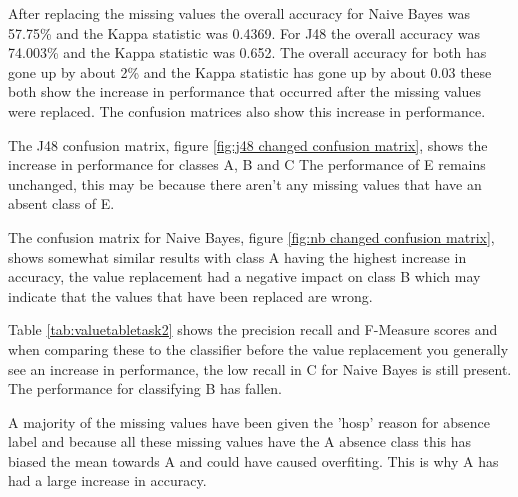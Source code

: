 \documentclass[10pt]{article}
\begin{document}
After replacing the missing values the overall accuracy for Naive Bayes was 57.75\% and the Kappa statistic was 0.4369. For J48 the overall accuracy was 74.003\% and the Kappa statistic was 0.652. The overall accuracy for both has gone up by about 2\% and the Kappa statistic has gone up by about 0.03 these both show the increase in performance that occurred after the missing values were replaced. The confusion matrices also show this increase in performance. 

The J48 confusion matrix, figure \ref{fig:j48 changed confusion matrix}, shows the increase in performance for classes A, B and C The performance of E remains unchanged, this may be because there aren't any missing values that have an absent class of E.

The confusion matrix for Naive Bayes, figure \ref{fig:nb changed confusion matrix}, shows somewhat similar results with class A having the highest increase in accuracy, the value replacement had a negative impact on class B which may indicate that the values that have been replaced are wrong.

Table \ref{tab:valuetabletask2} shows the precision recall and F-Measure scores and when comparing these to the classifier before the value replacement you generally see an increase in performance, the low recall in C for Naive Bayes is still present. The performance for classifying B has fallen.

A majority of the missing values have been given the 'hosp' reason for absence label and because all these missing values have the A absence class this has biased the mean towards A and could have caused overfiting. This is why A has had a large increase in accuracy.
\end{document}
